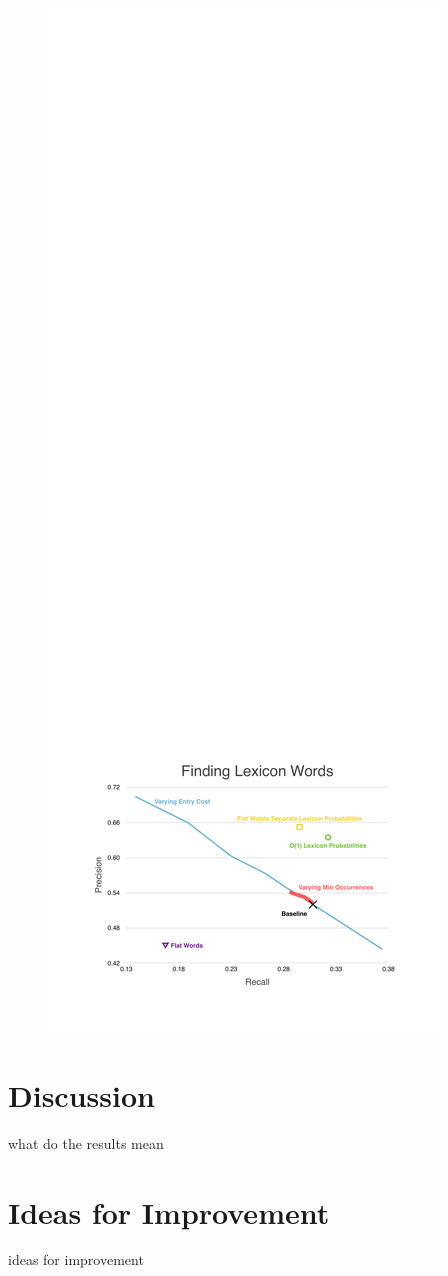 \documentclass[11pt, oneside, fleqn]{article}
\begin{document}
  \begin{figure}[h]
  \includegraphics{./figure/finding_lexiocn_words.pdf}
  \end{figure}

  \section{Discussion}

  what do the results mean

  \section{Ideas for Improvement}

  ideas for improvement
\end{document}
